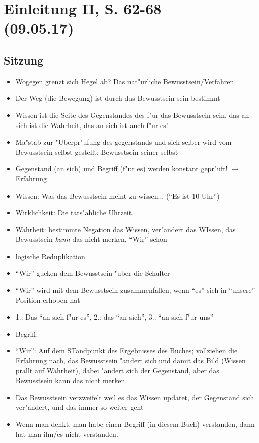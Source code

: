 \documentclass[emulatestandardclasses]{scrartcl}
\begin{document}
\section{Einleitung II, S. 62-68\\(09.05.17)}

\subsection{Sitzung}

\begin{itemize}
  \item Wogegen grenzt sich Hegel ab? Das nat"urliche Bewusstsein/Verfahren
  \item Der Weg (die Bewegung) ist durch das Bewusstsein sein bestimmt
  \item Wissen ist die Seite des Gegenstandes des f"ur das Bewusstsein sein, das an sich ist die Wahrheit, das an sich ist auch f"ur es! 
  \item Ma"stab zur "Uberpr"ufung des gegenstands und sich selber wird vom Bewusstsein selbst gestellt; Bewusstsein seiner selbst
  \item Gegenstand (an sich) und Begriff (f"ur es) werden konstant gepr"uft! $\rightarrow$ Erfahrung
  \item Wissen: Was das Bewusstsein meint zu wissen... ("`Es ist 10 Uhr"')
  \item Wirklichkeit: Die tats"ahliche Uhrzeit.
  \item Wahrheit: bestimmte Negation das Wissen, ver"andert das WIssen, das Bewusstsein \emph{kann} das nicht merken, "`Wir"' schon
  \item logische Reduplikation
  \item "`Wir"' gucken dem Bewusstsein "uber die Schulter
  \item "`Wir"' wird mit dem Bewusstsein zusammenfallen, wenn "`es"' sich in "`unsere"' Position erhoben hat
  \item 1.: Das "`an sich f"ur es"', 2.: das "`an sich"', 3.: "`an sich f"ur uns"'
  \item Begriff: 
  \item "`Wir"': Auf dem STandpunkt des Ergebnisses des Buches; vollziehen die Erfahrung nach, das Bewusstsein "andert sich und damit das Bild (Wissen prallt auf Wahrheit), dabei "andert sich der Gegenstand, aber das Bewusstsein kann das nicht merken
  \item Das Bewusstsein verzweifelt weil es das Wissen updatet, der Gegenstand sich ver"andert, und das immer so weiter geht
  \item Wenn man denkt, man habe einen Begriff (in diesem Buch) verstanden, dann hat man ihn/es nicht verstanden.
\end{itemize}
\end{document}
